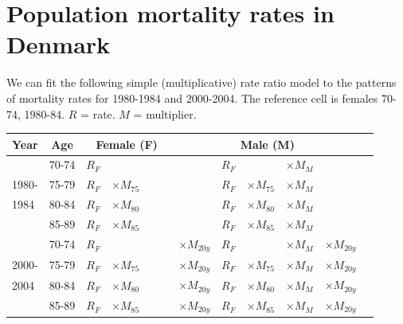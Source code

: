 \documentclass[landscape,twocolumn,letterpaper,9pt,reqno]{article}\usepackage[]{graphicx}\usepackage[]{color}
\begin{document}
\clearpage


\section{Population mortality rates in Denmark}
\small 

\vspace*{-.1in}

We can fit the following simple (multiplicative) rate ratio model to the 
patterns of mortality rates  for 1980-1984 and  2000-2004. The reference cell is females 70-74,   1980-84. $R$ = rate. $M$ = multiplier.

\begin{tabular}{|l c | l l  l  l  | l l l l | l |}
	\hline
	Year  & Age & \multicolumn{3}{c}{Female (F)} & &   \multicolumn{3}{c}{Male (M)} & \\ 
	\hline
	& 70-74 &  $R_{F}$ & & & & $R_{F}$ & & $\times M_{M}$  & \\
	1980- & 75-79 &  $R_{F}$ & $ \times M_{75}$ & &   & $R_{F}$ & $\times M_{75}$ & $\times M_{M}$ & \\
	1984 & 80-84 & $R_{F}$ & $ \times M_{80}$ &  & &  $R_{F}$ & $ \times M_{80}$ & $ \times M_{M}$ & \\
	& 85-89 & $R_{F}$ & $ \times M_{85}$ &  & &  $R_{F}$ & $ \times M_{85}$ & $ \times M_{M}$ & \\ 
	\hline
	& 70-74 &  $R_{F}$ &  & & $\times M_{20y}$  &  $R_{F}$ & & $  \times M_{M}$  & $\times M_{20y}$\\
	2000- & 75-79 &  $R_{F} $ & $\times M_{75}$ & & $\times M_{20y}$ &  $R_{F}$ & $ \times M_{75}$ & $ \times M_{M}$& $\times M_{20y}$ \\
	2004      & 80-84 & $R_{F}$ & $ \times M_{80}$ & & $\times M_{20y}$ &   $R_{F}$ & $ \times M_{80}$ & $ \times M_{M}$ & $\times M_{20y}$ \\
	& 85-89 & $R_{F}$ & $ \times M_{85}$ & \ \ \ & $\times M_{20y}$&   $R_{F}$ & $\times M_{85}$ & $\times M_{M}$ & $\times M_{20y}$ \\
	\hline
\end{tabular}

\end{document}
